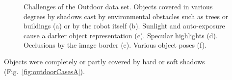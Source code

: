 \documentclass[conference]{IEEEtran}
\begin{document}
\begin{figure}
        \centering
	\vspace{1 pt}
	\vspace{1 pt}        
	\vspace{1 pt}
	\vspace{1 pt}
	\vspace{1 pt}
	\vspace{1 pt}
        \caption{Challenges of the Outdoor data set. Objects covered in various degrees by shadows cast by environmental obstacles 
        such as trees or buildings (a) or by the robot itself (b). Sunlight and auto-exposure cause a darker object representation (c). Specular highlights (d). 
        Occlusions by the image border (e). Various object poses (f).}
        \label{fig:outdoorCases}        
\end{figure}
Objects were completely or partly covered by hard or soft shadows (Fig.~\ref{fig:outdoorCasesA}). 
\end{document}
